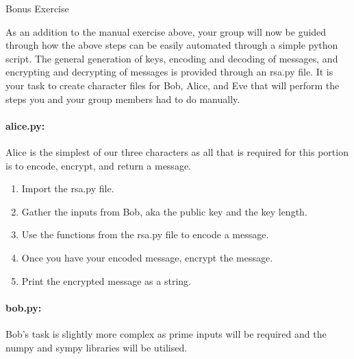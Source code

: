\documentclass{article}
\begin{document}
    \newpage
    \huge Bonus Exercise
    \normalsize

    As an addition to the manual exercise above, your group will now be guided through how the above steps can be easily automated through a simple python script. The general generation of keys, encoding and decoding of messages, and encrypting and decrypting of messages is provided through an rsa.py file. It is your task to create character files for Bob, Alice, and Eve that will perform the steps you and your group members had to do manually.

    \paragraph{alice.py:} Alice is the simplest of our three characters as all that is required for this portion is to encode, encrypt, and return a message.

    \begin{enumerate}
        \item Import the rsa.py file.

            \TextField[width=6in,height=1in, bordercolor=0 0 0, name=p3q1, multiline=true]{}

        \item Gather the inputs from Bob, aka the public key and the key length.
            
            \TextField[width=6in,height=1in, bordercolor=0 0 0, name=p3q1, multiline=true]{}

        \item Use the functions from the rsa.py file to encode a message.

            \TextField[width=6in,height=1in, bordercolor=0 0 0, name=p3q1, multiline=true]{}

        \item Once you have your encoded message, encrypt the message.

            \TextField[width=6in,height=1in, bordercolor=0 0 0, name=p3q1, multiline=true]{}

        \item Print the encrypted message as a string.

            \TextField[width=6in,height=1in, bordercolor=0 0 0, name=p3q1, multiline=true]{}

    \end{enumerate}

    \paragraph{bob.py:} Bob’s task is slightly more complex as prime inputs will be required and the numpy and sympy libraries will be utilised.
\end{document}
